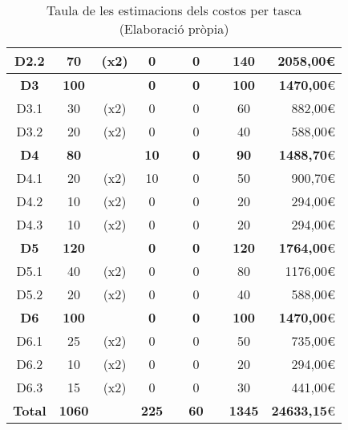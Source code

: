 \begin{table}[H]
\begin{tabular}{|c|cc|cc|cc|c|r|}
D2.2	&	70	&	{\footnotesize	(x2)}	&	0	&	&	0	&	&	140	&	2058,00\euro	\\	\hline
\textbf{D3}	&	\textbf{100}	&	&	\textbf{0}	&	&	\textbf{0}	&	&	\textbf{100}	&	\textbf{1470,00}\euro	\\	\hline
D3.1	&	30	&	{\footnotesize	(x2)}	&	0	&	&	0	&	&	60	&	882,00\euro	\\	\hline
D3.2	&	20	&	{\footnotesize	(x2)}	&	0	&	&	0	&	&	40	&	588,00\euro	\\	\hline
\textbf{D4}	&	\textbf{80}	&	&	\textbf{10}	&	&	\textbf{0}	&	&	\textbf{90}	&	\textbf{1488,70}\euro	\\	\hline
D4.1	&	20	&	{\footnotesize	(x2)}	&	10	&	&	0	&	&	50	&	900,70\euro	\\	\hline
D4.2	&	10	&	{\footnotesize	(x2)}	&	0	&	&	0	&	&	20	&	294,00\euro	\\	\hline
D4.3	&	10	&	{\footnotesize	(x2)}	&	0	&	&	0	&	&	20	&	294,00\euro	\\	\hline
\textbf{D5}	&	\textbf{120}	&	&	\textbf{0}	&	&	\textbf{0}	&	&	\textbf{120}	&	\textbf{1764,00}\euro	\\	\hline
D5.1	&	40	&	{\footnotesize	(x2)}	&	0	&	&	0	&	&	80	&	1176,00\euro	\\	\hline
D5.2	&	20	&	{\footnotesize	(x2)}	&	0	&	&	0	&	&	40	&	588,00\euro	\\	\hline
\textbf{D6}	&	\textbf{100}	&	&	\textbf{0}	&	&	\textbf{0}	&	&	\textbf{100}	&	\textbf{1470,00}\euro	\\	\hline
D6.1	&	25	&	{\footnotesize	(x2)}	&	0	&	&	0	&	&	50	&	735,00\euro	\\	\hline
D6.2	&	10	&	{\footnotesize	(x2)}	&	0	&	&	0	&	&	20	&	294,00\euro	\\	\hline
D6.3	&	15	&	{\footnotesize	(x2)}	&	0	&	&	0	&	&	30	&	441,00\euro	\\	\hline
\textbf{Total}	&	\textbf{1060}	&	&	\textbf{225}	&	&	\textbf{60}	&	&	\textbf{1345}	&	\textbf{24633,15}\euro	\\	\hline
\end{tabular}
\caption[Costos per tasca]{Taula de les estimacions dels costos per tasca \\ (Elaboració pròpia)}
\label{fig:costos_tasques}
\end{table}











